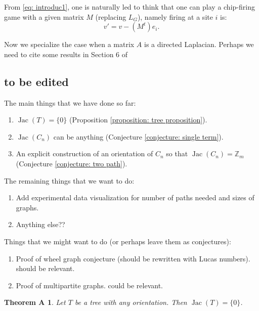 \documentclass[11pt,reqno]{amsart}
\DeclareMathOperator{\Jac}{Jac}
\theoremstyle{definition}
\theoremstyle{plain}
\newtheorem*{nothma}{Theorem A}
\begin{document}
From \eqref{eq: introduc1}, one is naturally led to think that one can play a chip-firing game with a given matrix $M$ (replacing $L_G$), namely firing at a site $i$ is:
\begin{equation}\label{eq: introduc2}
	v'=v - (M^t)e_i.
\end{equation}


Now we specialize the case when a matrix $A$ is a directed Laplacian. Perhaps we need to cite some results in Section 6 of \cite{klivans2018mathematics}





\subsection{to be edited}



The main things that we have done so far:
\begin{enumerate}
	\item 
$\Jac(T)=\{0\}$ (Proposition \ref{proposition: tree proposition}). 
\item 
$\Jac(C_n)$ can be anything (Conjecture \ref{conjecture: single term}). 
\item 
An explicit construction of an orientation of $C_n$ so that $\Jac(C_n)=\mathbb{Z}_m$ (Conjecture \ref{conjecture: two path}). 
\end{enumerate}

The remaining things that we want to do:
\begin{enumerate}
	\item 
Add experimental data visualization for number of paths needed and sizes of graphs. 
	\item 
Anything else??
\end{enumerate}

Things that we might want to do (or perhaps leave them as conjectures):
\begin{enumerate}
	\item 
Proof of wheel graph conjecture (should be rewritten with Lucas numbers). \cite{biggs1999chip} should be relevant. 
\item 
Proof of multipartite graphs. \cite{jacobson2003critical} could be relevant. 
\end{enumerate}

\begin{nothma}
Let $T$ be a tree with any orientation. Then $\Jac(T)=\{0\}$. 
\end{nothma}
\end{document}
